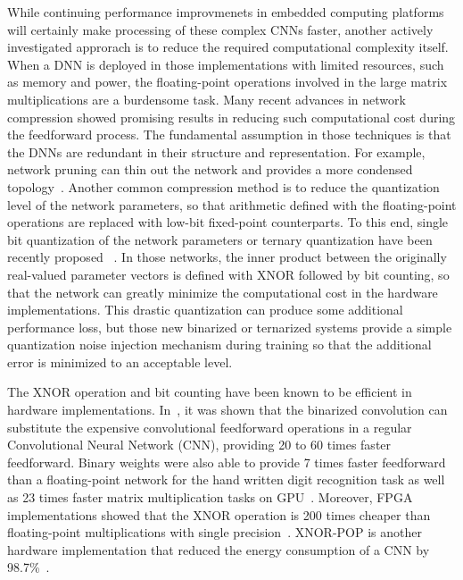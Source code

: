 While continuing performance improvmenets in embedded computing
platforms will certainly make processing of these complex CNNs faster,
another actively investigated approrach is to reduce the required
computational complexity itself.
When a DNN is deployed in those implementations with limited
resources, such as memory and power, the floating-point operations
involved in the large matrix multiplications are a burdensome task.
Many recent advances in network compression showed promising results
in reducing such computational cost during the feedforward
process. The fundamental assumption in those techniques is that the
DNNs are redundant in their structure and representation. For example,
network pruning can thin out the network and provides a more condensed
topology~\cite{han2015deep}.
Another common compression method is to reduce the
quantization level of the network parameters, so that arithmetic
defined with the floating-point operations are replaced with low-bit
fixed-point counterparts. To this end, single bit quantization of the
network parameters or ternary quantization have been recently proposed
~\cite{hwang2014fixed,soudry2014expectation,kim2016bitwise,rastegari2016xnor,hubara2016binarized,beauchamp2006embedded,govindu2004analysis}.
In those networks, the inner product between the
originally real-valued parameter vectors is defined with XNOR followed
by bit counting, so that the network can greatly minimize the
computational cost in the hardware implementations. This drastic
quantization can produce some additional performance loss, but those
new binarized or ternarized systems provide a simple quantization
noise injection mechanism during training so that the additional error
is minimized to an acceptable level.

The XNOR operation and bit counting have been known to be efficient in
hardware implementations. In~\cite{rastegari2016xnor}, it was shown
that the binarized convolution can substitute the expensive
convolutional feedforward operations in a regular Convolutional Neural
Network (CNN), %
providing 20 to 60 times faster feedforward. Binary weights were also
able to provide 7 times faster feedforward than a floating-point
network for the hand written digit recognition task as well as 23
times faster matrix multiplication tasks on
GPU~\cite{hubara2016binarized}.
Moreover, FPGA implementations showed that the XNOR operation is 200
times cheaper than floating-point multiplications with 
single precision~\cite{beauchamp2006embedded,govindu2004analysis}.
XNOR-POP is another hardware implementation that reduced
the energy consumption of a CNN by 98.7\%~\cite{jiang2017xnor}.

